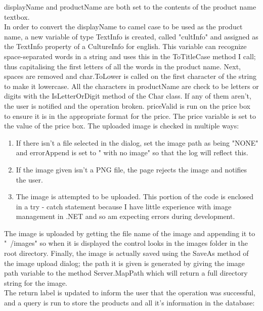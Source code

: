 ﻿\documentclass{article}
\begin{document}
\begin{itemize}
        displayName and productName are both set to the contents of the product name textbox.
        \\
        In order to convert the displayName to camel case to be used as the product name, a new variable of type TextInfo is created, called "cultInfo" and assigned as the TextInfo property of a CultureInfo for english.
        This variable can recognize space-separated words in a string and uses this in the ToTitleCase method I call; thus capitalising the first letters of all the words in the product name.
        Next, spaces are removed and char.ToLower is called on the first character of the string to make it lowercase.
        All the characters in productName are check to be letters or digits with the IsLetterOrDigit method of the Char class.
        If any of them aren't, the user is notified and the operation broken.
        priceValid is run on the price box to ensure it is in the appropriate format for the price.
        The price variable is set to the value of the price box.
        The uploaded image is checked in multiple ways:
        \begin{enumerate}
            \item If there isn't a file selected in the dialog, set the image path as being "NONE" and errorAppend is set to " with no image" so that the log will reflect this.
            \item If the image given isn't a PNG file, the page rejects the image and notifies the user.
            \item The image is attempted to be uploaded.
            This portion of the code is enclosed in a try - catch statement because I have little experience with image management in .NET and so am expecting errors during development.
        \end{enumerate}
        The image is uploaded by getting the file name of the image and appending it to "~/images" so when it is displayed the control looks in the images folder in the root directory.
        Finally, the image is actually saved using the SaveAs method of the image upload dialog; the path it is given is generated by giving the image path variable to the method Server.MapPath which will return a full directory string for the image.
        \\
        The return label is updated to inform the user that the operation was successful, and a query is run to store the products and all it's information in the database:
        \begin{lstlisting}[language=SQL]

\end{lstlisting}
\end{itemize}
\end{document}
